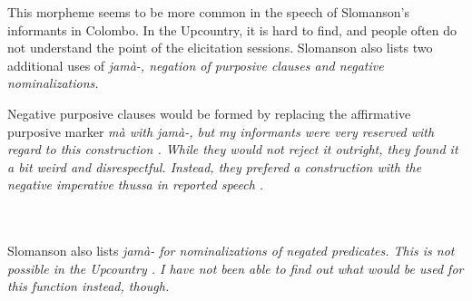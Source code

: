 This morpheme seems to be more common in the speech of Slomanson's informants in Colombo. In the Upcountry, it is hard to find, and people often do not understand the point of the elicitation sessions.  Slomanson also lists two additional uses of \em jamà-\em, negation of purposive clauses and negative nominalizations.

Negative purposive clauses would be formed by replacing the affirmative purposive marker \em mà \em with \em jamà-\em, but my informants were very reserved with regard to this construction . While they would not reject it outright, they found it a bit weird and disrespectful. Instead, they prefered a construction with the negative imperative \em thussa \em in reported speech .



 \\


 \\

Slomanson also lists \em jamà- \em for nominalizations of negated predicates. This is not possible  in the Upcountry . I have not been able to find out what would be used for this function instead, though.


 \\

 



